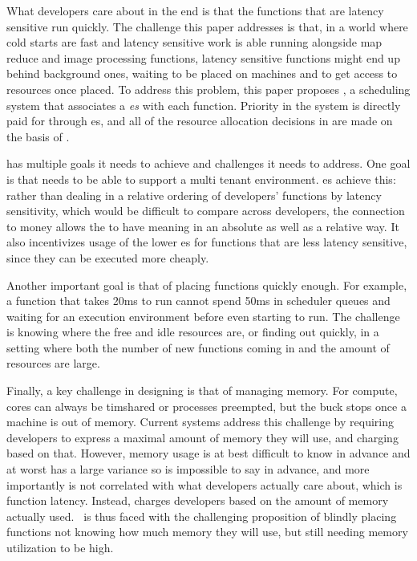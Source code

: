 What developers care about in the end is that the functions that are latency
sensitive run quickly. The challenge this paper addresses is that, in a world
where cold starts are fast and latency sensitive work is able running alongside
map reduce and image processing functions, latency sensitive functions might end
up behind background ones, waiting to be placed on machines and to get access to
resources once placed. To address this problem, this paper proposes \sys{}, a
scheduling system that associates a \textit{\priceclass{}es} with each function.
Priority in the system is directly paid for through \priceclass{}es, and all of
the resource allocation decisions in \sys{} are made on the basis of
\priceclass{}.

\Sys{} has multiple goals it needs to achieve and challenges it needs to
address. One goal is that \sys{} needs to be able to support a multi tenant
environment. \Priceclass{}es achieve this: rather than dealing in a relative
ordering of developers' functions by latency sensitivity, which would be
difficult to compare across developers, the connection to money allows the
\class{} to have meaning in an absolute as well as a relative way. It also
incentivizes usage of the lower \class{}es for functions that are less
latency sensitive, since they can be executed more cheaply.


Another important goal is that of placing functions quickly enough. For example,
a function that takes 20ms to run cannot spend 50ms in scheduler queues and
waiting for an execution environment before even starting to run. The challenge
is knowing where the free and idle resources are, or finding out quickly, in a
setting where both the number of new functions coming in and the amount of
resources are large.


Finally, a key challenge in designing \sys{} is that of managing memory. For
compute, cores can always be timshared or processes preempted, but the buck
stops once a machine is out of memory. Current systems address this challenge by
requiring developers to express a maximal amount of memory they will use, and
charging based on that. However, memory usage is at best difficult to know in
advance and at worst has a large variance so is impossible to say in advance,
and more importantly is not correlated with what developers actually care about,
which is function latency. Instead, \sys{} charges developers based on the
amount of memory actually used.~\Sys{} is thus faced with the challenging
proposition of blindly placing functions not knowing how much memory they will
use, but still needing memory utilization to be high.
 
